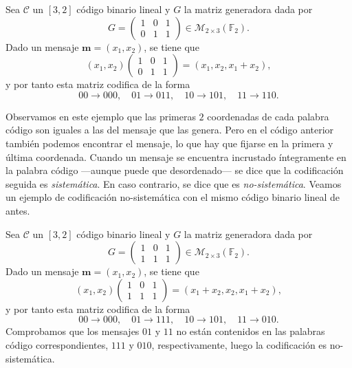 \begin{example}
  Sea \(\mathcal C\) un \([3, 2]\) código binario lineal y \(G\) la matriz generadora dada por 
  \[
    G = \begin{pmatrix}
      1 & 0 & 1 \\ 0 & 1 & 1
    \end{pmatrix} \in \mathcal M_{2 \times 3}(\mathbb F_2).
  \]
  Dado un mensaje \(\mathbf{m} = (x_1, x_2)\), se tiene que \[(x_1, x_2) \begin{pmatrix}
    1 & 0 & 1 \\ 0 & 1 & 1
  \end{pmatrix} = (x_1, x_2, x_1 + x_2),\] y por tanto esta matriz codifica de la forma \[00 \to 000, \quad 01 \to 011,\quad 10 \to 101,\quad 11 \to 110.\]
\end{example}

Observamos en este ejemplo que las primeras \(2\) coordenadas de cada palabra código son iguales a las del mensaje que las genera.
Pero en el código anterior también podemos encontrar el mensaje, lo que hay que fijarse en la primera y última coordenada.
Cuando un mensaje se encuentra incrustado íntegramente en la palabra código —aunque puede que desordenado— se dice que la codificación seguida es \textit{sistemática}.
En caso contrario, se dice que es \textit{no-sistemática}.
Veamos un ejemplo de codificación no-sistemática con el mismo código binario lineal de antes.

\begin{example}
  \label{ej:codificacion-no-sistematica}
  Sea \(\mathcal C\) un \([3, 2]\) código binario lineal y \(G\) la matriz generadora dada por 
  \[
    G = \begin{pmatrix}
      1 & 0 & 1 \\ 1 & 1 & 1
    \end{pmatrix} \in \mathcal M_{2 \times 3}(\mathbb F_2).
  \]
  Dado un mensaje \(\mathbf{m} = (x_1, x_2)\), se tiene que \[(x_1, x_2) \begin{pmatrix}
    1 & 0 & 1 \\ 1 & 1 & 1
  \end{pmatrix} = (x_1 + x_2, x_2, x_1 + x_2),\] y por tanto esta matriz codifica de la forma \[00 \to 000, \quad 01 \to 111,\quad 10 \to 101,\quad 11 \to 010.\]
  Comprobamos que los mensajes \(01\) y \(11\) no están contenidos en las palabras código correspondientes, \(111\) y \(010\), respectivamente, luego la codificación es no-sistemática.
\end{example}

